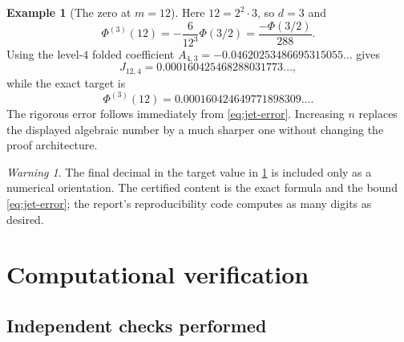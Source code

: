\documentclass[11pt,oneside]{article}
\theoremstyle{definition}
\newtheorem{example}[theorem]{Example}
\theoremstyle{remark}
\newtheorem{warning}[theorem]{Warning}
\newcommand{\PhiU}{\Phi}
\begin{document}
\begin{example}[The zero at $m=12$]\label{ex:jet-12}
Here $12=2^2\cdot3$, so $d=3$ and
\[
 \PhiU^{(3)}(12)=-\frac{6}{12^3}\PhiU(3/2)
 =\frac{-\PhiU(3/2)}{288}.
\]
Using the level-$4$ folded coefficient
$A_{4,3}=-0.04620253486695315055\ldots$ gives
\[
 J_{12,4}=0.000160425468288031773\ldots,
\]
while the exact target is
\[
 \PhiU^{(3)}(12)=0.000160424649771898309\ldots.
\]
The rigorous error follows immediately from \eqref{eq:jet-error}.  Increasing
$n$ replaces the displayed algebraic number by a much sharper one without
changing the proof architecture.
\end{example}

\begin{warning}
The final decimal in the target value in \cref{ex:jet-12} is included only as a
numerical orientation.  The certified content is the exact formula and the
bound \eqref{eq:jet-error}; the report's reproducibility code computes as many
digits as desired.
\end{warning}

\section{Computational verification}\label{sec:verification}

\subsection{Independent checks performed}
\end{document}
